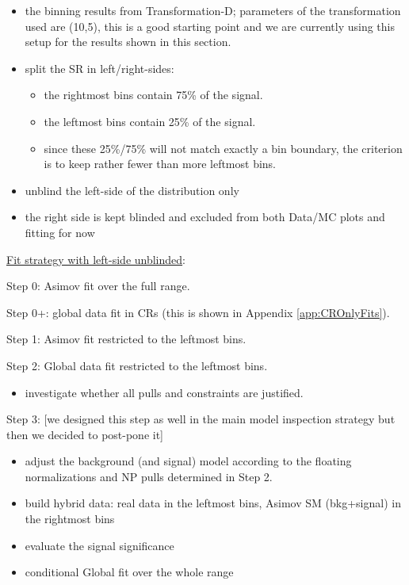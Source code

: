 \begin{itemize}
  \item the binning results from Transformation-D; parameters of the transformation used are (10,5), 
        this is a good starting point and we are currently using this setup for the results shown in this section.
  \item split the SR in left/right-sides:
    \begin{itemize}
      \item the rightmost bins contain 75\% of the signal.
      \item the leftmost bins contain 25\% of the signal.
      \item since these 25\%/75\% will not match exactly a bin boundary, the criterion is to keep rather fewer than more leftmost bins.
    \end{itemize}
    \item unblind the left-side of the distribution only
    \item the right side is kept blinded and excluded from both Data/MC plots and fitting for now
\end{itemize}

\underline{Fit strategy with left-side unblinded}:
\begin{itemize}
  \item Step 0: Asimov fit over the full range.
  \item Step 0+: global data fit in CRs (this is shown in Appendix \ref{app:CROnlyFits}).
  \item Step 1: Asimov fit restricted to the leftmost bins.
  \item Step 2: Global data fit restricted to the leftmost bins.
    \begin{itemize}
      \item investigate whether all pulls and constraints are justified. 
    \end{itemize}
  {\color{gray}
  \item Step 3: %
    [we designed this step as well in the main model inspection strategy but then we decided to post-pone it]
  \begin{itemize}
      \item adjust the background (and signal) model according to the floating normalizations and NP pulls determined in Step 2.
      \item build hybrid data: real data in the leftmost bins, Asimov SM (bkg+signal) in the rightmost bins
      \item evaluate the signal significance 
      \item conditional Global fit over the whole range
    \end{itemize}
  }
\end{itemize}


